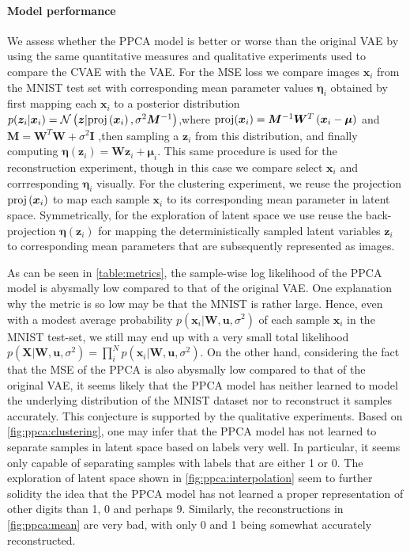 \paragraph{Model performance}
We assess whether the PPCA model is better or worse than the original VAE by using the same quantitative measures and qualitative experiments used to compare the CVAE with the VAE\@. For the MSE loss we compare images $\bm{x}_i$ from the MNIST test set with corresponding mean parameter values $\bm{\eta}_i$ obtained by first mapping each $\bm{x}_i$ to a posterior distribution $p(\bm{z}_i|\bm{x}_i) = \mathcal{N}\left (\bm{z}| \text{proj}\left (\bm{x}_i\right), \sigma^2 \bm{M}^{-1}\right)$,where  $\text{proj}(\bm{x}_i) = \bm{M}^{-1} \bm{W}^T\left (\bm{x}_i - \bm{\mu}\right)$ and $\bm{M} = \bm{W}^{T}\bm{W} + \sigma^2 \bm{I}$ ,then sampling a $\bm{z}_i$ from this distribution, and finally computing $\bm{\eta}(\bm{z}_i) = \bm{W}\bm{z}_i + \bm{\mu}_i$. This same procedure is used for the reconstruction experiment, though in this case we compare select $\bm{x}_i$ and corrresponding $\bm{\eta}_i$ visually. For the clustering experiment, we reuse the projection  $\text{proj}\left (\bm{x}_i\right)$ to map each sample $\bm{x}_i$ to its corresponding mean parameter in latent space. Symmetrically, for the exploration of latent space we use reuse the back-projection $\bm{\eta}(\bm{z}_i)$ for mapping the deterministically sampled latent variables $\bm{z}_i$ to corresponding mean parameters that are subsequently represented as images.

As can be seen in \cref{table:metrics}, the sample-wise log likelihood of the PPCA model is abysmally low compared to that of the original VAE\@. One explanation why the metric is so low may be that the MNIST is rather large. Hence, even with a modest average probability $p(\bm{x}_i | \bm{W}, \bm{u}, \sigma^2)$ of each sample $\bm{x}_i$ in the MNIST test-set, we still may end up with a very small total likelihood $p(\bm{X}|\bm{W}, \bm{u}, \sigma^2 ) = \prod_{i}^{N}p(\bm{x}_i | \bm{W}, \bm{u}, \sigma^2)$. On the other hand, considering the fact that the MSE of the PPCA is also abysmally low compared to that of the original VAE, it seems likely that the PPCA model has neither learned to model the underlying distribution of the MNIST dataset nor to reconstruct it samples accurately. This conjecture is supported by the qualitative experiments. Based on \cref{fig:ppca:clustering}, one may infer that the PPCA model has not learned to separate samples in latent space based on labels very well. In particular, it seems only capable of separating samples with labels that are either 1 or 0. The exploration of latent space shown in \cref{fig:ppca:interpolation} seem to further solidity the idea that the PPCA model has not learned a proper representation of other digits than 1, 0 and perhaps 9. Similarly, the reconstructions in \cref{fig:ppca:mean} are very bad, with only 0 and 1 being somewhat accurately reconstructed.

